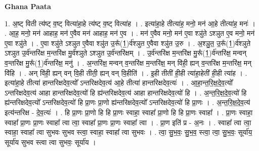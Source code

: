 \documentclass[17pt]{extarticle}
\begin{document}
\textbf{Ghana Paata } \newline

1. अ॒ष्ट् विती त्य॑ष्ट् व॒ष्ट् वित्या॑हा॒हे त्य॑ष्ट् व॒ष्ट् वित्या॑ह । . इत्या॑हा॒हे तीत्या॑ह॒ मनो॒ मन॑ आ॒हे तीत्या॑ह॒ मनः॑ । . आ॒ह॒ मनो॒ मन॑ आहाह॒ मन॑ ए॒वैव मन॑ आहाह॒ मन॑ ए॒व । . मन॑ ए॒वैव मनो॒ मन॑ ए॒वा श्ञु॑ते ऽश्ञुत ए॒व मनो॒ मन॑ ए॒वा श्ञु॑ते । . ए॒वा श्ञु॑ते ऽश्ञुत ए॒वैवा श्ञु॑त उ॒रू᳚(1॒)र्व॑श्ञुत ए॒वैवा श्ञु॑त उ॒रु । . अ॒श्ञु॒त॒ उ॒रू᳚(1॒)र्व॑श्ञुते ऽश्ञुत उ॒र्व॑न्तरि॑क्ष म॒न्तरि॑क्ष मु॒र्व॑श्ञुते ऽश्ञुत उ॒र्व॑न्तरि॑क्षम् । . उ॒र्व॑न्तरि॑क्ष म॒न्तरि॑क्ष मु॒रू᳚(1॒)र्व॑न्तरि॑क्ष॒ मन्वन् व॒न्तरि॑क्ष मु॒रू᳚(1॒)र्व॑न्तरि॑क्ष॒ मनु॑ । . अ॒न्तरि॑क्ष॒ मन्वन् व॒न्तरि॑क्ष म॒न्तरि॑क्ष॒ मन् वि॑ही॒ ह्यन् व॒न्तरि॑क्ष म॒न्तरि॑क्ष॒ मन् वि॑हि । . अन् वि॑ही॒ ह्यन् वन् वि॒ही तीती॒ ह्यन् वन् वि॒हीति॑ । . इ॒ही तीती॑ ही॒ही त्या॑हा॒हेती॑ ही॒ही त्या॑ह । . इत्या॑हा॒हे तीत्या॑ हान्तरिक्षदेव॒त्यो᳚ ऽन्तरिक्षदेव॒त्य॑ आ॒हे तीत्या॑ हान्तरिक्षदेव॒त्यः॑ । . आ॒हा॒न्त॒रि॒क्ष॒दे॒व॒त्यो᳚ ऽन्तरिक्षदेव॒त्य॑ आहा हान्तरिक्षदेव॒त्यो॑ हि ह्य॑न्तरिक्षदेव॒त्य॑ आहा हान्तरिक्षदेव॒त्यो॑ हि । . अ॒न्त॒रि॒क्ष॒दे॒व॒त्यो॑ हि ह्य॑न्तरिक्षदेव॒त्यो᳚ ऽन्तरिक्षदेव॒त्यो॑ हि प्रा॒णः प्रा॒णो ह्य॑न्तरिक्षदेव॒त्यो᳚ ऽन्तरिक्षदेव॒त्यो॑ हि प्रा॒णः । . अ॒न्त॒रि॒क्ष॒दे॒व॒त्य॑ इत्य॑न्तरिक्ष - दे॒व॒त्यः॑ । . हि प्रा॒णः प्रा॒णो हि हि प्रा॒णः स्वाहा॒ स्वाहा᳚ प्रा॒णो हि हि प्रा॒णः स्वाहा᳚ । . प्रा॒णः स्वाहा॒ स्वाहा᳚ प्रा॒णः प्रा॒णः स्वाहा᳚ त्वा त्वा॒ स्वाहा᳚ प्रा॒णः प्रा॒णः स्वाहा᳚ त्वा । . प्रा॒ण इति॑ प्र - अ॒नः । . स्वाहा᳚ त्वा त्वा॒ स्वाहा॒ स्वाहा᳚ त्वा सुभवः सुभव स्त्वा॒ स्वाहा॒ स्वाहा᳚ त्वा सुभवः । . त्वा॒ सु॒भ॒वः॒ सु॒भ॒व॒ स्त्वा॒ त्वा॒ सु॒भ॒वः॒ सूर्या॑य॒ सूर्या॑य सुभव स्त्वा त्वा सुभवः॒ सूर्या॑य । \newline
\end{document}
